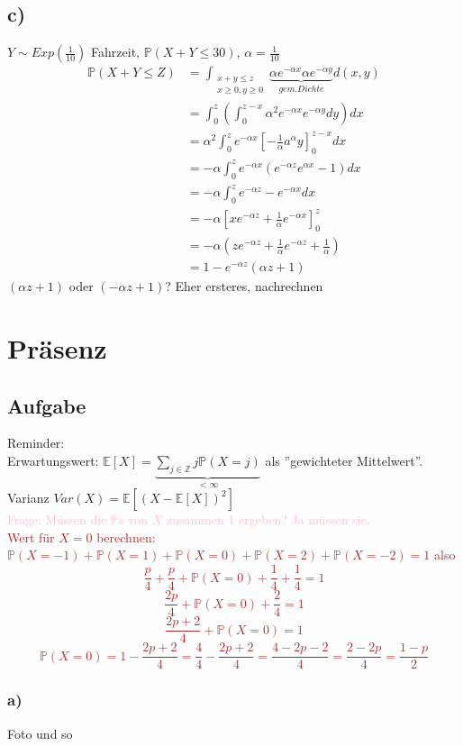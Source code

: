 \documentclass{article} %
\newcommand{\p}[0]{\mathbb{P}}
\begin{document}
\subsection*{c)}
$Y \sim Exp(\frac{1}{10})$ Fahrzeit, $\p(X+Y \leq 30)$, $\alpha = \frac{1}{10}$
\begin{align*}
     \p(X+Y \leq Z) &= \int_\substack{x+y \leq z \\ x \geq 0, y \geq 0} \underbrace{\alpha e^{-\alpha x } \alpha e^{-\alpha y}}_{gem. Dichte} d (x,y) \\
     &= \int_0^z  ( \int_0^{z-x} \alpha^2 e^{- \alpha x} e^{- \alpha y} dy) dx \\
     &= \alpha^2 \int_0^z e^{- \alpha x} [-\frac{1}{\alpha} a^{\alpha}y]^{z-x}_0 dx \\
     &= - \alpha \int_0^z e^{- \alpha x} (e^{- \alpha z} e^{\alpha x} -1) dx \\
     &= - \alpha \int_0^z e^{- \alpha z} - e^{- \alpha x} dx \\
     &= - \alpha [x e^{- \alpha z} + \frac{1}{\alpha} e^{- \alpha x}]^z_0 \\
     &= - \alpha (z e^{- \alpha z}+ \frac{1}{\alpha} e^{-\alpha z} + \frac{1}{\alpha}) \\
     &= 1 - e^{-\alpha z} (\alpha z +1)
\end{align*}
$ (\alpha z +1)$ oder $ (-\alpha z +1)$? Eher ersteres, nachrechnen

\section{Präsenz}
\subsection{Aufgabe}
Reminder: \\
Erwartungswert: \( \mathbb{E}[X] = \underbrace{\sum_{j \in \mathbb{Z}} j \p(X=j)}_{< \infty}  \) als ''gewichteter Mittelwert''. \\
Varianz \(Var(X) = \mathbb{E}[(X-\mathbb{E}[X])^2]\) \\
\textcolor{pink}{Frage: Müssen die $\p$s von $X$ zusammen 1 ergeben? Ja müssen sie.} \\
\textcolor{brown}{
Wert für $X=0$ berechnen: \\
\(\p(X=-1) + \p(X=1) + \p(X=0) + \p(X=2) + \p(X=-2) = 1\) also 
\[
\frac{p}{4} + \frac{p}{4} + \p(X=0) + \frac{1}{4} + \frac{1}{4} = 1
\]
\[
\frac{2p}{4} + \p(X=0) + \frac{2}{4}  = 1
\]
\[
\frac{2p + 2}{4} + \p(X=0)  = 1
\]
\[
 \p(X=0)  = 1 - \frac{2p + 2}{4}= \frac{4}{4} - \frac{2p + 2}{4} = \frac{4-2p - 2}{4} = \frac{2-2p}{4} = \frac{1-p}{2}
\]
}
\subsubsection*{a)}
Foto und so 
\end{document}
